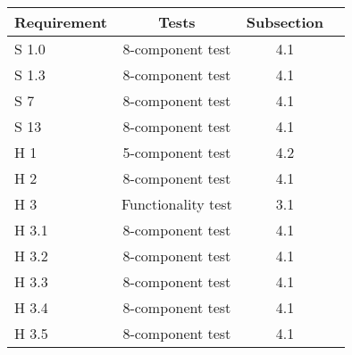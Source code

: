 %

\begin{tabular}{lccc}
Requirement & Tests & Subsection\\
\hline
S 1.0       & 8-component test   & 4.1 \\
S 1.3       & 8-component test   & 4.1 \\
S 7         & 8-component test   & 4.1 \\
S 13        & 8-component test   & 4.1 \\
H 1         & 5-component test   & 4.2 \\
H 2         & 8-component test   & 4.1 \\
H 3         & Functionality test & 3.1 \\
H 3.1       & 8-component test   & 4.1 \\
H 3.2       & 8-component test   & 4.1 \\
H 3.3       & 8-component test   & 4.1 \\
H 3.4       & 8-component test   & 4.1 \\
H 3.5       & 8-component test   & 4.1
\end{tabular}

%
